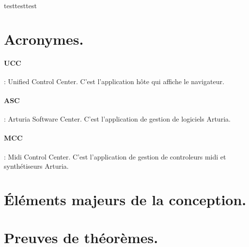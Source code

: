 \documentclass[francais]{rapportPFE}  %
\begin{document}

%
 
 
 
 
 
 





testtesttest


\appendix
\section{Acronymes.}
\paragraph{UCC}: Unified Control Center. C'est l'application hôte qui affiche le navigateur.
\paragraph{ASC}: Arturia Software Center. C'est l'application de gestion de logiciels Arturia.
\paragraph{MCC}: Midi Control Center. C'est l'application de gestion de controleurs midi et synthétiseurs Arturia.

\section{Éléments majeurs de la conception.}

\section{Preuves de théorèmes.}
\end{document}
